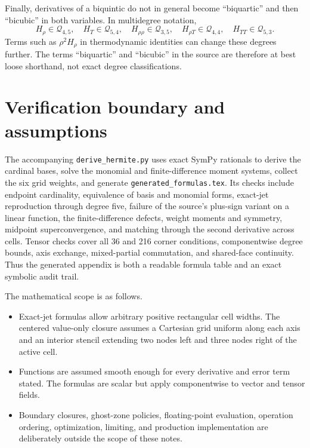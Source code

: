 \documentclass[11pt]{article}
\newcommand{\Q}{\mathcal{Q}}
\begin{document}
Finally, derivatives of a biquintic do not in general become ``biquartic''
and then ``bicubic'' in both variables.  In multidegree notation,
\begin{equation}
  H_\rho\in\Q_{4,5},\quad H_T\in\Q_{5,4},\quad
  H_{\rho\rho}\in\Q_{3,5},\quad
  H_{\rho T}\in\Q_{4,4},\quad
  H_{TT}\in\Q_{5,3}.
  \label{eq:anisotropic-degrees}
\end{equation}
Terms such as $\rho^2H_\rho$ in thermodynamic identities can change these
degrees further.  The terms ``biquartic'' and ``bicubic'' in the source are
therefore at best loose shorthand, not exact degree classifications.

\section{Verification boundary and assumptions}
\label{sec:scope}

The accompanying \texttt{derive\_hermite.py} uses exact SymPy rationals to
derive the cardinal bases, solve the monomial and finite-difference moment
systems, collect the six grid weights, and generate
\texttt{generated\_formulas.tex}.  Its checks include endpoint cardinality,
equivalence of basis and monomial forms, exact-jet reproduction through
degree five, failure of the source's plus-sign variant on a linear function,
the finite-difference defects, weight moments and symmetry, midpoint
superconvergence, and matching through the second derivative across cells.
Tensor checks cover all 36 and 216 corner conditions, componentwise degree
bounds, axis exchange, mixed-partial commutation, and shared-face
continuity.  Thus the generated appendix is both a readable formula table and
an exact symbolic audit trail.

The mathematical scope is as follows.
\begin{itemize}
  \item Exact-jet formulas allow arbitrary positive rectangular cell widths.
  The centered value-only closure assumes a Cartesian grid uniform along each
  axis and an interior stencil extending two nodes left and three nodes right
  of the active cell.
  \item Functions are assumed smooth enough for every derivative and error
  term stated.  The formulas are scalar but apply componentwise to vector and
  tensor fields.
  \item Boundary closures, ghost-zone policies, floating-point evaluation,
  operation ordering, optimization, limiting, and production implementation
  are deliberately outside the scope of these notes.
\end{itemize}
\end{document}
